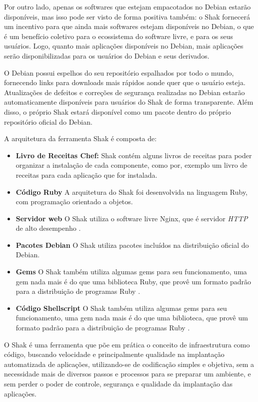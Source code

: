 Por outro lado, apenas os softwares que estejam empacotados no Debian estarão
disponíveis, mas isso pode ser visto de forma positiva também: o Shak
fornecerá um incentivo para que ainda mais softwares estejam disponíveis no
Debian, o que é um benefício coletivo para o ecossistema do software livre, e
para os seus usuários. Logo, quanto mais aplicações disponíveis no Debian,
mais aplicações serão disponibilizadas para os usuários do Debian e seus derivados.

O Debian possui espelhos do seu repositório espalhados por todo o mundo,
fornecendo links para downloads mais rápidos aonde quer que o usuário esteja.
Atualizações de defeitos e correções de segurança realizadas no Debian estarão
automaticamente disponíveis para usuários do Shak de forma transparente. Além disso,
o próprio Shak estará disponível como um pacote dentro do próprio repositório oficial do Debian.

A arquitetura da ferramenta Shak é composta de:

\begin{itemize}
  \item  \textbf{Livro de Receitas Chef:} Shak contém alguns livros de receitas
  para poder organizar a instalação de cada componente, como por, exemplo um livro
  de receitas para cada aplicação que for instalada.
  \item  \textbf{Código Ruby} A arquitetura do Shak foi desenvolvida na linguagem
  Ruby, com programação orientado a objetos.
  \item  \textbf{Servidor web} O Shak utiliza o software livre Nginx, que é
  servidor \textit{HTTP} de alto desempenho \cite{nginx}.
  \item  \textbf{Pacotes Debian} O Shak utiliza pacotes incluídos na distribuição
  oficial do Debian.
  \item  \textbf{Gems} O Shak também utiliza algumas gems para seu funcionamento,
  uma gem nada mais é do que uma biblioteca Ruby, que provê um formato padrão para
  a distribuição de programas Ruby \cite{gem}.
  \item  \textbf{Código Shellscript} O Shak também utiliza algumas gems para seu funcionamento,
  uma gem nada mais é do que uma biblioteca, que provê um formato padrão para
  a distribuição de programas Ruby \cite{gem}.
\end{itemize}

O Shak é uma ferramenta que põe em prática o conceito de infraestrutura
como código, buscando velocidade e principalmente qualidade na implantação
automatizada de aplicações, utilizando-se de codificação simples e objetiva,
sem a necessidade mais de diversos passos e processos para se preparar um ambiente,
e sem perder o poder de controle, segurança e qualidade da implantação das aplicações.

